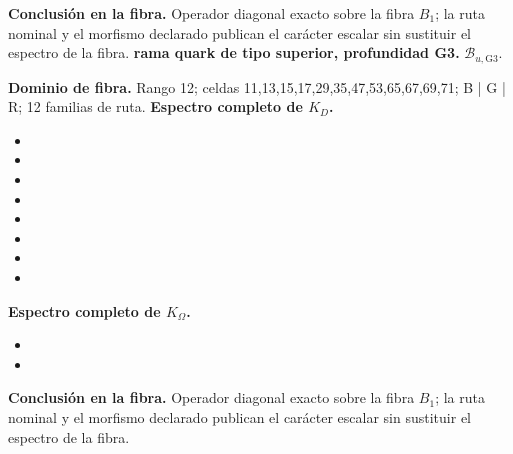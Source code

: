 \noindent\textbf{Conclusión en la fibra.} Operador diagonal exacto sobre la fibra \(B_1\); la ruta nominal y el morfismo declarado publican el carácter escalar sin sustituir el espectro de la fibra.
\medskip
{}
\noindent\textbf{rama quark de tipo superior, profundidad G3.} \(\mathcal B_{u,\mathrm{G3}}\).\par
\noindent\textbf{Dominio de fibra.} Rango 12; celdas 11,13,15,17,29,35,47,53,65,67,69,71; B | G | R; 12 familias de ruta.
\noindent\textbf{Espectro completo de \(K_D\).}
\begin{itemize}
\item \texttt{}
\item \texttt{}
\item \texttt{}
\item \texttt{}
\item \texttt{}
\item \texttt{}
\item \texttt{}
\item \texttt{}
\end{itemize}
\noindent\textbf{Espectro completo de \(K_\Omega\).}
\begin{itemize}
\item \texttt{}
\item \texttt{}
\end{itemize}
\noindent\textbf{Conclusión en la fibra.} Operador diagonal exacto sobre la fibra \(B_1\); la ruta nominal y el morfismo declarado publican el carácter escalar sin sustituir el espectro de la fibra.
\medskip
\endgroup
